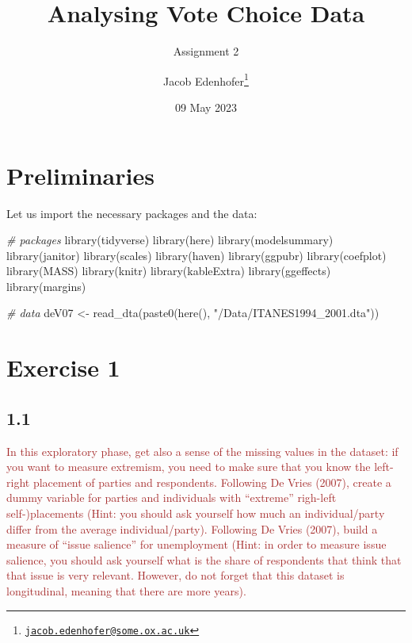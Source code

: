 \documentclass[
]{article}
\title{Analysing Vote Choice Data}
\subtitle{Assignment 2}
\author{Jacob Edenhofer\footnote{\href{mailto:jacob.edenhofer@some.ox.ac.uk}{\nolinkurl{jacob.edenhofer@some.ox.ac.uk}}}}
\date{09 May 2023}
\newenvironment{Shaded}{\begin{snugshade}}{\end{snugshade}}
\newcommand{\CommentTok}[1]{\textcolor[rgb]{0.56,0.35,0.01}{\textit{#1}}}
\newcommand{\FunctionTok}[1]{\textcolor[rgb]{0.00,0.00,0.00}{#1}}
\newcommand{\NormalTok}[1]{#1}
\newcommand{\OtherTok}[1]{\textcolor[rgb]{0.56,0.35,0.01}{#1}}
\newcommand{\StringTok}[1]{\textcolor[rgb]{0.31,0.60,0.02}{#1}}
\begin{document}
\maketitle

\hypertarget{preliminaries}{%
\section{Preliminaries}\label{preliminaries}}

Let us import the necessary packages and the data:

\begin{Shaded}
\begin{Highlighting}[]
\CommentTok{\# packages }
\FunctionTok{library}\NormalTok{(tidyverse)}
\FunctionTok{library}\NormalTok{(here)}
\FunctionTok{library}\NormalTok{(modelsummary)}
\FunctionTok{library}\NormalTok{(janitor)}
\FunctionTok{library}\NormalTok{(scales)}
\FunctionTok{library}\NormalTok{(haven)}
\FunctionTok{library}\NormalTok{(ggpubr)}
\FunctionTok{library}\NormalTok{(coefplot)}
\FunctionTok{library}\NormalTok{(MASS)}
\FunctionTok{library}\NormalTok{(knitr)}
\FunctionTok{library}\NormalTok{(kableExtra)}
\FunctionTok{library}\NormalTok{(ggeffects)}
\FunctionTok{library}\NormalTok{(margins)}

\CommentTok{\# data}
\NormalTok{deV07 }\OtherTok{\textless{}{-}} \FunctionTok{read\_dta}\NormalTok{(}\FunctionTok{paste0}\NormalTok{(}\FunctionTok{here}\NormalTok{(), }\StringTok{"/Data/ITANES1994\_2001.dta"}\NormalTok{))}
\end{Highlighting}
\end{Shaded}

\hypertarget{exercise-1}{%
\section{Exercise 1}\label{exercise-1}}

\hypertarget{section}{%
\subsection{1.1}\label{section}}

\textcolor{brown}{In this exploratory phase, get also a sense of the missing values in the dataset: if you want to measure extremism, you need to make sure that you know the left-right placement of parties and respondents. Following De Vries (2007), create a dummy variable for parties and individuals with “extreme” righ-left self-)placements (Hint: you should ask yourself how much an individual/party differ from the average individual/party). Following De Vries (2007), build a measure of “issue salience” for unemployment (Hint: in order to measure issue salience, you should ask yourself what is the share of respondents that think that that issue is very relevant. However, do not forget that this dataset is longitudinal, meaning that there are more years).}
\end{document}
